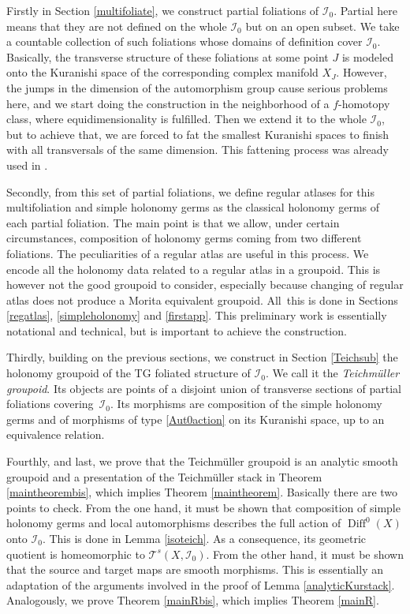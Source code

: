 \documentclass[JEP,XML,SOM,Unicode]{cedram}
\let\mathcal\mathscr
\DeclareMathOperator{\Diff}{Diff}
\theoremstyle{plain}
\theoremstyle{definition}
\theoremstyle{remark}
\numberwithin{equation}{section}
\newcommand{\cI}{\mathcal{I}}
\begin{document}
Firstly in Section \ref{multifoliate}, we construct partial foliations of $\cI_0$. Partial here means that they are not defined on the whole $\cI_0$ but on an open subset. We take a countable collection of such foliations whose domains of definition cover $\cI_0$. Basically, the transverse structure of these foliations at some point $J$ is modeled onto the Kuranishi space of the corresponding complex manifold $X_J$. However, the jumps in the dimension of the automorphism group cause serious problems here, and we start doing the construction in the neighborhood of a $f$-homotopy class, where equidimensionality is fulfilled. Then we extend it to the whole $\cI_0$, but to achieve that, we are forced to fat the smallest Kuranishi spaces to finish with all transversals of the same dimension. This fattening process was already used in \cite{circle}.

Secondly, from this set of partial foliations, we define regular atlases for this multifoliation and simple holonomy germs as the classical holonomy germs of each partial foliation. The main point is that we allow, under certain circumstances, composition of holonomy germs coming from two different foliations. The peculiarities of a regular atlas are useful in this process. We encode all the holonomy data related to a regular atlas in a groupoid. This is however not the good groupoid to consider, especially because changing of regular atlas does not produce a Morita equivalent groupoid. All~this is done in Sections \ref{regatlas}, \ref{simpleholonomy} and \ref{firstapp}. This preliminary work is essentially notational and technical, but is important to achieve the construction.

Thirdly, building on the previous sections, we construct in Section \ref{Teichsub} the holonomy groupoid of the TG foliated structure of $\cI_0$. We call it the \emph{Teichmüller groupoid}. Its objects are points of a disjoint union of transverse sections of partial foliations covering~$\cI_0$. Its morphisms are composition of the simple holonomy germs and of morphisms of type \eqref{Aut0action} on its Kuranishi space, up to an equivalence relation.

Fourthly, and last, we prove that the Teichmüller groupoid is an analytic smooth groupoid and a presentation of the Teichmüller stack in Theorem \ref{maintheorembis}, which implies Theorem \ref{maintheorem}. Basically there are two points to check. From the one hand, it must be shown that composition of simple holonomy germs and local automorphisms describes the full action of $\Diff^0(X)$ onto $\cI_0$. This is done in Lemma \ref{isoteich}. As a consequence, its geometric quotient is homeomorphic to $\mathcal T^s(X,\cI_0)$. From the other hand, it must be shown that the source and target maps are smooth morphisms. This is essentially an adaptation of the arguments involved in the proof of Lemma \ref{analyticKurstack}. Analogously, we prove Theorem \ref{mainRbis}, which implies Theorem \ref{mainR}.
\end{document}
